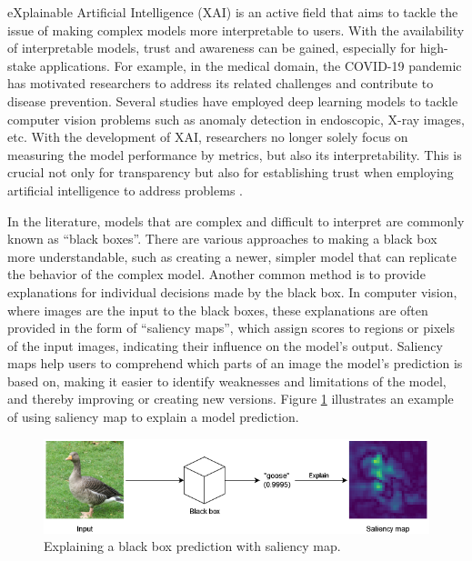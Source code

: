 eXplainable Artificial Intelligence (XAI) is an active field that aims to tackle the issue of making complex models more interpretable to users. With the availability of interpretable models, trust and awareness can be gained, especially for high-stake applications. For example, in the medical domain, the COVID-19 pandemic has motivated researchers to address its related challenges and contribute to disease prevention. Several studies have employed deep learning models to tackle computer vision problems such as anomaly detection in endoscopic, X-ray images, etc. With the development of XAI, researchers no longer solely focus on measuring the model performance by metrics, but also its interpretability. This is crucial not only for transparency but also for establishing trust when employing artificial intelligence to address problems \cite{explainableCovidModel}.

In the literature, models that are complex and difficult to interpret are commonly known as ``black boxes''. There are various approaches to making a black box more understandable, such as creating a newer, simpler model that can replicate the behavior of the complex model. Another common method is to provide explanations for individual decisions made by the black box. In computer vision, where images are the input to the black boxes, these explanations are often provided in the form of ``saliency maps'', which assign scores to regions or pixels of the input images, indicating their influence on the model's output. Saliency maps help users to comprehend which parts of an image the model's prediction is based on, making it easier to identify weaknesses and limitations of the model, and thereby improving or creating new versions. Figure \ref{fig:saliencyExample} illustrates an example of using saliency map to explain a model prediction.

\begin{figure}
    \centering
    \includegraphics[width=\textwidth]{images/saliency_example.png}
    \caption{Explaining a black box prediction with saliency map.}
    \label{fig:saliencyExample}
\end{figure}


